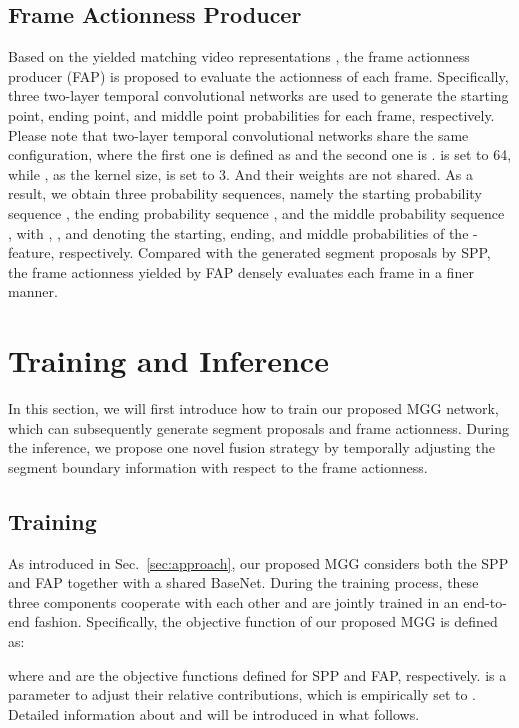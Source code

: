 \documentclass[10pt,twocolumn,letterpaper]{article}
\begin{document}
\subsection{Frame Actionness Producer}
Based on the yielded matching video representations , the frame actionness producer (FAP) is proposed to evaluate the actionness  of each frame. Specifically, three two-layer temporal convolutional networks are used to generate the starting point, ending point, and middle point probabilities for each frame, respectively. Please note that two-layer temporal convolutional networks share the same configuration, where the first one is defined as  and the second one is  .  is set to 64, while , as the kernel size, is set to 3. And their weights are not shared. As a result, we obtain three probability sequences, namely the  starting probability sequence , the ending probability sequence
, and
the middle probability sequence , with  ,  , and  denoting the starting,  ending, and middle probabilities of the - feature, respectively. Compared with the generated segment proposals by SPP, the frame actionness yielded by FAP densely evaluates each frame in a finer manner.   


\section{Training and Inference}

In this section, we will first introduce how to train our proposed MGG network, which can subsequently generate segment proposals and frame  actionness. During the inference, we propose one novel fusion strategy by temporally adjusting the  segment boundary information with respect to the frame actionness. 
 
\subsection{Training}
As introduced in Sec.~\ref{sec:approach}, our proposed MGG considers both the SPP and FAP together with a shared BaseNet. During the training process, these three components cooperate with each other and are jointly trained in an end-to-end fashion. Specifically, the objective function of our proposed MGG is defined as:

where  and  are the objective functions defined for SPP and FAP, respectively.  is a parameter to adjust their relative contributions, which is empirically set to . Detailed information about  and  will be introduced in what follows.
\end{document}
